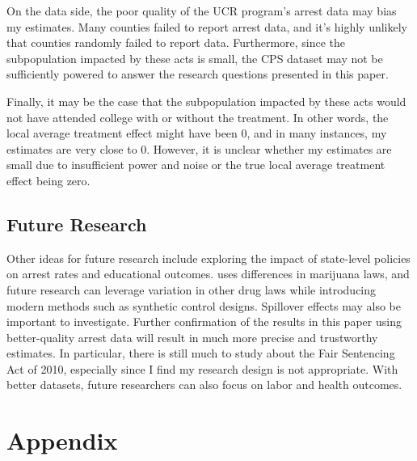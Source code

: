 \documentclass{article}
\begin{document}
On the data side, the poor quality of the UCR program's arrest data may bias my estimates. Many counties failed to report arrest data, and it's highly unlikely that counties randomly failed to report data. Furthermore, since the subpopulation impacted by these acts is small, the CPS dataset may not be sufficiently powered to answer the research questions presented in this paper.

Finally, it may be the case that the subpopulation impacted by these acts would not have attended college with or without the treatment. In other words, the local average treatment effect might have been 0, and in many instances, my estimates are very close to 0. However, it is unclear whether my estimates are small due to insufficient power and noise or the true local average treatment effect being zero.

\subsection{Future Research}

Other ideas for future research include exploring the impact of state-level policies on arrest rates and educational outcomes. \cite{britton2022} uses differences in marijuana laws, and future research can leverage variation in other drug laws while introducing modern methods such as synthetic control designs. Spillover effects may also be important to investigate. Further confirmation of the results in this paper using better-quality arrest data will result in much more precise and trustworthy estimates. In particular, there is still much to study about the Fair Sentencing Act of 2010, especially since I find my research design is not appropriate. With better datasets, future researchers can also focus on labor and health outcomes.



\clearpage



\clearpage



\clearpage



\clearpage

\clearpage
\appendix
\section*{Appendix}
\beginsupplement
\end{document}

